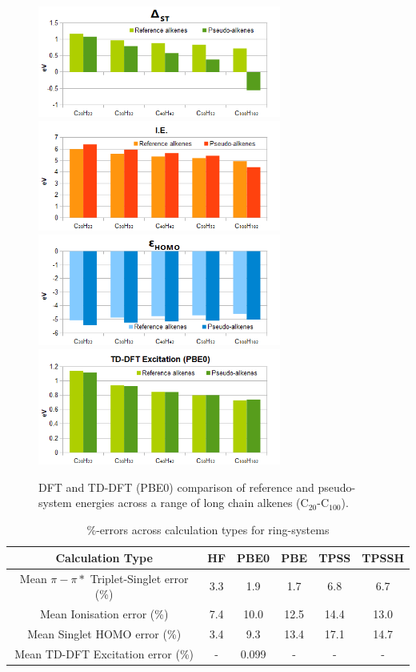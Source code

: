 \documentclass[journal=jctcce,manuscript=article]{achemso}
\begin{document}
\begin{figure}[h]
\includegraphics[width=8cm]{pbe0_excitation_long}
\includegraphics[width=8cm]{pbe0_ionisation_long}
\includegraphics[width=8cm]{pbe0_homo_long}
\includegraphics[width=8cm]{tddft_excitation_long}
\caption{DFT and TD-DFT (PBE0) comparison of reference and pseudo-system energies across a range of long chain alkenes (C\(_{20}\)-C\(_{100}\)).}
\label{fig:long_chain_graphs}
\end{figure}

\begin{table}[h]
\caption{\%-errors across calculation types for ring-systems}
\begin{tabular}{c c c c c c }
\hline
Calculation Type & HF & PBE0 & PBE & TPSS & TPSSH \\
\hline
Mean \(\pi - \pi*\) Triplet-Singlet error (\%) & 3.3 & 1.9 & 1.7 & 6.8 & 6.7 \\
Mean Ionisation error (\%) & 7.4 & 10.0 & 12.5 & 14.4 & 13.0 \\
Mean Singlet HOMO error (\%) & 3.4  & 9.3  & 13.4 & 17.1 & 14.7 \\
Mean TD-DFT Excitation error (\%) & - & 0.099 & - & - & - \\ 
\hline
\end{tabular}
\label{table:ring_system_errors}
\end{table}
\end{document}
